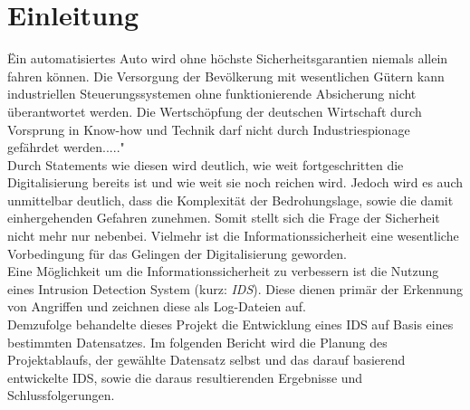 \documentclass[main.tex]{subfiles}
\begin{document}
\author{Philipp Nickel}
\section{Einleitung}
\"Ein automatisiertes Auto wird ohne höchste Sicherheitsgarantien niemals allein fahren können. Die Versorgung der Bevölkerung mit wesentlichen Gütern kann industriellen Steuerungssystemen ohne funktionierende Absicherung nicht überantwortet werden. Die Wertschöpfung der deutschen Wirtschaft durch Vorsprung in Know-how und Technik darf nicht durch Industriespionage gefährdet werden....."\ \\
Durch Statements wie diesen wird deutlich, wie weit fortgeschritten die Digitalisierung bereits ist und wie weit sie noch reichen wird. Jedoch wird es auch unmittelbar deutlich, dass die Komplexität der Bedrohungslage, sowie die damit einhergehenden Gefahren zunehmen. Somit stellt sich die Frage der Sicherheit nicht mehr nur nebenbei. Vielmehr ist die Informationssicherheit eine wesentliche Vorbedingung für das Gelingen der Digitalisierung geworden.
\\ 
Eine Möglichkeit um die Informationssicherheit zu verbessern ist die Nutzung eines Intrusion Detection System (kurz: \textit{IDS}). Diese dienen primär der Erkennung von Angriffen und zeichnen diese als Log-Dateien auf.
\\
Demzufolge behandelte dieses Projekt die Entwicklung eines IDS auf Basis eines bestimmten Datensatzes. Im folgenden Bericht wird die Planung des Projektablaufs, der gewählte Datensatz selbst und das darauf basierend entwickelte IDS, sowie die daraus resultierenden Ergebnisse und Schlussfolgerungen.
\\
\end{document}
